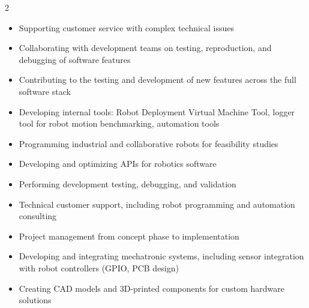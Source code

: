 \documentclass[9pt,a4paper,withhyper]{altacv}
\begin{document}

\makecvheader


\begin{paracol}{2}

    \begin{itemize}
      \item Supporting customer service with complex technical issues
      \item Collaborating with development teams on testing, reproduction, and debugging of software features
      \item Contributing to the testing and development of new features across the full software stack
      \item Developing internal tools: Robot Deployment Virtual Machine Tool, logger tool for robot motion benchmarking, automation tools
    \end{itemize}

  \divider

    \begin{itemize}
        \item Programming industrial and collaborative robots for feasibility studies  
        \item Developing and optimizing APIs for robotics software  
        \item Performing development testing, debugging, and validation  
        \item Technical customer support, including robot programming and automation consulting  
        \item Project management from concept phase to implementation  
        \item Developing and integrating mechatronic systems, including sensor integration with robot controllers (GPIO, PCB design)  
        \item Creating CAD models and 3D-printed components for custom hardware solutions  
    \end{itemize}


\end{paracol}
\end{document}
